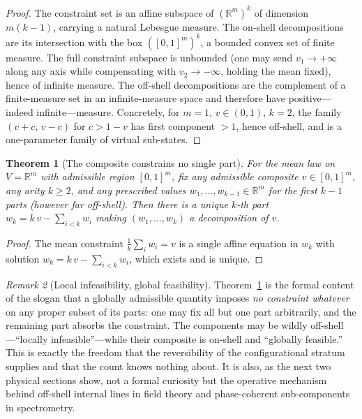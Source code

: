 \documentclass[11pt,a4paper]{article}
\theoremstyle{thmstyle}
\newtheorem{theorem}{Theorem}[section]
\theoremstyle{definition}
\theoremstyle{remark}
\newtheorem{remark}[theorem]{Remark}
\newcommand{\R}{\mathbb{R}}
\begin{document}
\begin{proof}
The constraint set is an affine subspace of $(\R^m)^k$ of dimension
$m(k-1)$, carrying a natural Lebesgue measure. The on-shell decompositions
are its intersection with the box $([0,1]^m)^k$, a bounded convex set of
finite measure. The full constraint subspace is unbounded (one may send
$v_1\to+\infty$ along any axis while compensating with $v_2\to-\infty$,
holding the mean fixed), hence of infinite measure. The off-shell
decompositions are the complement of a finite-measure set in an
infinite-measure space and therefore have positive---indeed
infinite---measure. Concretely, for $m=1$, $v\in(0,1)$, $k=2$, the family
$(v+c,\,v-c)$ for $c>1-v$ has first component $>1$, hence off-shell, and is
a one-parameter family of virtual sub-states.
\end{proof}

\begin{theorem}[The composite constrains no single part]
\label{thm:miracle}
For the mean law on $V=\R^m$ with admissible region $[0,1]^m$, fix any
admissible composite $v\in[0,1]^m$, any arity $k\geq 2$, and any
prescribed values $w_1,\dots,w_{k-1}\in\R^m$ for the first $k-1$ parts
(however far off-shell). Then there is a unique $k$-th part
$w_k=k\,v-\sum_{i<k}w_i$ making $(w_1,\dots,w_k)$ a decomposition of $v$.
\end{theorem}

\begin{proof}
The mean constraint $\tfrac1k\sum_i w_i=v$ is a single affine equation in
$w_k$ with solution $w_k=k\,v-\sum_{i<k}w_i$, which exists and is unique.
\end{proof}

\begin{remark}[Local infeasibility, global feasibility]
\label{rem:localglobal}
Theorem~\ref{thm:miracle} is the formal content of the slogan that a
globally admissible quantity imposes \emph{no constraint whatever} on any
proper subset of its parts: one may fix all but one part arbitrarily, and
the remaining part absorbs the constraint. The components may be wildly
off-shell---``locally infeasible''---while their composite is on-shell and
``globally feasible.'' This is exactly the freedom that the reversibility
of the configurational stratum supplies and that the count knows nothing
about. It is also, as the next two physical sections show, not a formal
curiosity but the operative mechanism behind off-shell internal lines in
field theory and phase-coherent sub-components in spectrometry.
\end{remark}
\end{document}
